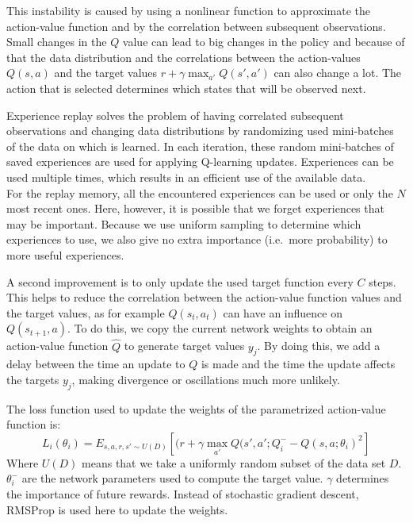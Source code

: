 This instability is caused by using a nonlinear function to approximate the action-value function and by the correlation between subsequent observations.
Small changes in the $Q$ value can lead to big changes in the policy and because of that the data distribution and the correlations between the action-values $Q(s,a)$ and the target values $r+\gamma \max_{a'} Q(s',a')$ can also change a lot.
The action that is selected determines which states that will be observed next.

Experience replay solves the problem of having correlated subsequent observations and changing data distributions by randomizing used mini-batches of the data on which is learned.
In each iteration, these random mini-batches of saved experiences are used for applying Q-learning updates.
Experiences can be used multiple times, which results in an efficient use of the available data.\\
For the replay memory, all the encountered experiences can be used or only the $N$ most recent ones.
Here, however, it is possible that we forget experiences that may be important.
Because we use uniform sampling to determine which experiences to use, we also give no extra importance (i.e.\ more probability) to more useful experiences.

A second improvement is to only update the used target function every $C$ steps.
This helps to reduce the correlation between the action-value function values and the target values, as for example $Q(s_t, a_t)$ can have an influence on $Q(s_{t+1},a)$.
To do this, we copy the current network weights to obtain an action-value function $\hat{Q}$ to generate target values $y_j$.
By doing this, we add a delay between the time an update to $Q$ is made and the time the update affects the targets $y_j$, making divergence or oscillations much more unlikely.

The loss function used to update the weights of the parametrized action-value function is:
\begin{equation}
L_i(\theta_i) = E_{s,a,r,s' \sim U(D)} \left [ (r + \gamma \max_{a'} Q(s',a'; Q^{-}_i - Q(s,a;\theta_i)^2 \right ]
\end{equation}
Where $U(D)$ means that we take a uniformly random subset of the data set $D$. $\theta^{-}_i$ are the network parameters used to compute the target value. $\gamma$ determines the importance of future rewards. Instead of stochastic gradient descent, RMSProp is used here to update the weights.\\

